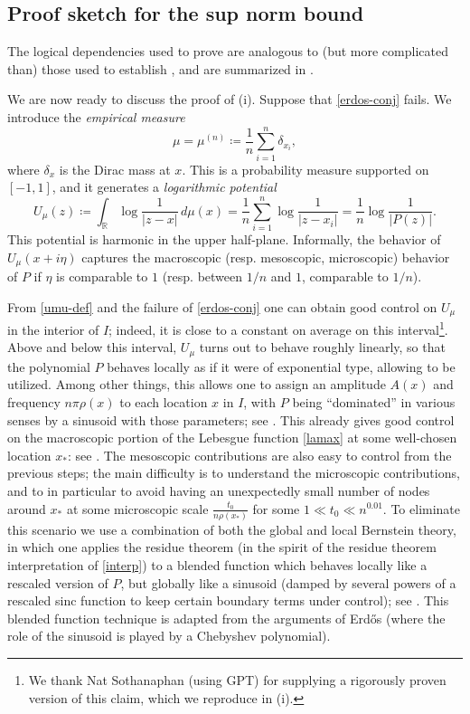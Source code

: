 \documentclass[12pt]{amsart}
\newcommand{\R}{\mathbb{R}}
\begin{document}
\subsection{Proof sketch for the sup norm bound}

The logical dependencies used to prove  are analogous to (but more complicated than) those used to establish , and are summarized in .

We are now ready to discuss the proof of (i).  Suppose that \eqref{erdos-conj} fails.
We introduce the \emph{empirical measure}
\begin{equation}\label{empirical}
 \mu = \mu^{(n)} \coloneqq \frac{1}{n} \sum_{i=1}^n \delta_{x_i},
\end{equation}
where $\delta_x$ is the Dirac mass at $x$.  This is a probability measure supported on $[-1,1]$, and it generates a \emph{logarithmic potential}
\begin{equation}\label{umu-def}
 U_\mu(z) \coloneqq \int_\R \log \frac{1}{|z-x|}\,d\mu(x) = \frac{1}{n} \sum_{i=1}^n \log \frac{1}{|z-x_i|} = \frac{1}{n} \log \frac{1}{|P(z)|}.
\end{equation}
This potential is harmonic in the upper half-plane.  Informally, the behavior of $U_\mu(x+i\eta)$ captures the macroscopic (resp. mesoscopic, microscopic) behavior of $P$ if $\eta$ is comparable to $1$ (resp. between $1/n$ and $1$, comparable to $1/n$).


From \eqref{umu-def} and the failure of \eqref{erdos-conj} one can obtain good control on $U_\mu$ in the interior of $I$; indeed, it is close to a constant on average on this interval\footnote{We thank Nat Sothanaphan \cite{gpt} (using GPT) for supplying a rigorously proven version of this claim, which we reproduce in (i).}.  Above and below this interval, $U_\mu$ turns out to behave roughly linearly, so that the polynomial $P$ behaves locally as if it were of exponential type, allowing  to be utilized.  Among other things, this allows one to assign an amplitude $A(x)$ and frequency $n\pi \rho(x)$ to each location $x$ in $I$, with $P$ being ``dominated'' in various senses by a sinusoid with those parameters; see .   This already gives good control on the macroscopic portion of the Lebesgue function \eqref{lamax} at some well-chosen location $x_*$: see .  The mesoscopic contributions are also easy to control from the previous steps; the main difficulty is to understand the microscopic contributions, and to in particular to avoid having an unexpectedly small number of nodes around $x_*$ at some microscopic scale $\frac{t_0}{n\rho(x_*)}$ for some $1 \ll t_0 \ll n^{0.01}$.  To eliminate this scenario we use a combination of both the global and local Bernstein theory, in which one applies the residue theorem (in the spirit of the residue theorem interpretation of \eqref{interp}) to a blended function which behaves locally like a rescaled version of $P$, but globally like a sinusoid (damped by several powers of a rescaled sinc function to keep certain boundary terms under control); see .  This blended function technique is adapted from the arguments of Erd\H{o}s \cite{erdos} (where the role of the sinusoid is played by a Chebyshev polynomial).
\end{document}
